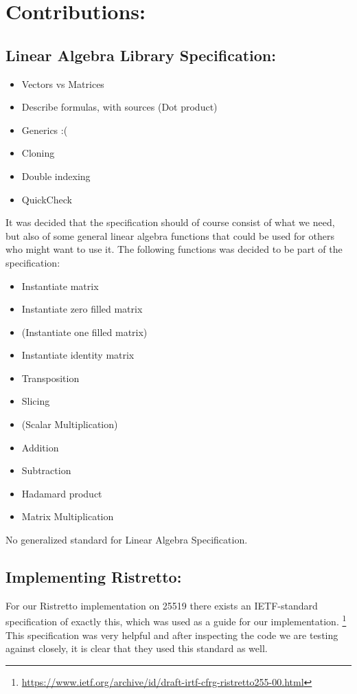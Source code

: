 \documentclass{article}
\begin{document}
\section{Contributions:}

\subsection{Linear Algebra Library Specification:}
\begin{itemize}
	\item Vectors vs Matrices 
	\item Describe formulas, with sources (Dot product) 
	\item Generics :(
	\item Cloning
	\item Double indexing
	\item QuickCheck
\end{itemize} 

It was decided that the specification should of course consist of what we
need, but also of some general linear algebra functions that could be
used for others who might want to use it. The following functions was
decided to be part of the specification:

\begin{itemize}
	\item Instantiate matrix
	\item Instantiate zero filled matrix
	\item (Instantiate one filled matrix)
	\item Instantiate identity matrix
	\item Transposition
	\item Slicing
	\item (Scalar Multiplication)
	\item Addition
	\item Subtraction
	\item Hadamard product
	\item Matrix Multiplication
\end{itemize}

No generalized standard for Linear Algebra Specification.

\subsection{Implementing Ristretto:} \label{implementing-ristretto}

For our Ristretto implementation on 25519 there
exists an IETF-standard specification of exactly
this, which was used as a guide for our implementation.
\footnote{\url{https://www.ietf.org/archive/id/draft-irtf-cfrg-ristretto255-00.html}}
This specification was very helpful and after inspecting the code we
are testing against closely, it is clear that they used this standard
as well.
\end{document}
